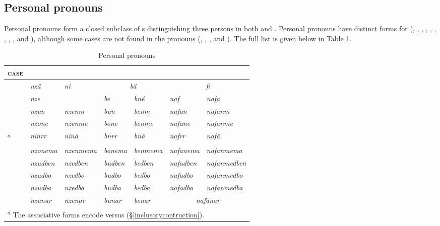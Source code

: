\subsection{Personal pronouns} \label{personalpron}

Personal pronouns form a closed subclass of s distinguishing three persons in both  and  . Personal pronouns have distinct forms for  (, , , , , , , , , and ), although some cases are not found in the pronouns (, , , and ). The full list is given below in Table \ref{perspron}.

\begin{table}
{\renewcommand{\tabcolsep}{4pt}
\caption{Personal pronouns}
\begin{tabularx}{\textwidth}{Xllllll}
\label{perspron}\\
	\lsptoprule
	\textsc{case}&\Fsg{}&\Fnsg{}&\Ssg{}&\Snsg{}&\Tsg{}&\Tnsg{}\\ \midrule
	\hline
	\Abs{}&\multicolumn{1}{l|}{\emph{nzä}}&\multirow{2}{*}{\emph{ni}}&\multicolumn{2}{|c|}{\emph{bä}\hspace{.5cm}}&\multicolumn{2}{c|}{\emph{fi}}\\\cline{4-5}\cline{6-7}
	\Erg{}&\multicolumn{1}{l|}{\emph{nze}}&&\multicolumn{1}{|l}{\emph{be}}&\emph{bné}&\emph{naf}&\emph{nafa}\\\cline{3-3}
	\Dat{}&\emph{nzun}&\emph{nzenm}&\emph{bun}&\emph{benm}&\emph{nafan}&\emph{nafanm}\\
	\Poss{}&\emph{nzone}&\emph{nzenme}&\emph{bone}&\emph{benme}&\emph{nafane}&\emph{nafanme}\\
	\Assoc{}\textsuperscript{a}&\emph{ninrr}&\emph{ninä}&\emph{bnrr}&\emph{bnä}&\emph{nafrr}&\emph{nafä}\\
	\Char{}&\emph{nzonema}&\emph{nzenmema}&\emph{bonema}&\emph{benmema}&\emph{nafanema}&\emph{nafanmema}\\
	\Loc{}&\emph{nzudben}&\emph{nzedben}&\emph{budben}&\emph{bedben}&\emph{nafadben}&\emph{nafanmedben}\\
	\All{}&\emph{nzudbo}&\emph{nzedbo}&\emph{budbo}&\emph{bedbo}&\emph{nafadbo}&\emph{nafanmedbo}\\
	\Abl{}&\emph{nzudba}&\emph{nzedba}&\emph{budba}&\emph{bedba}&\emph{nafadba}&\emph{nafanmedba}\\\cline{6-7}
	\Purp{}&\emph{nzunar}&\emph{nzenar}&\emph{bunar}&\emph{benar}&\multicolumn{2}{|c|}{\emph{nafanar}}\\
	\hline 
	\bottomrule
	\multicolumn{7}{l}{\footnotesize{\textsuperscript{a} The associative forms encode \Du{} versus \Pl{} (\S{}\ref{inclusorycontruction}).}}\\
\end{tabularx}}%
\end{table}


